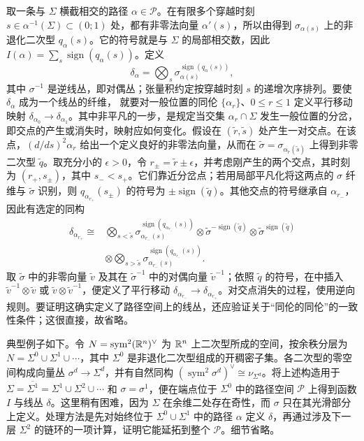 取一条与 $\Sigma$ 横截相交的路径 $\alpha\in\mathcal P$。在有限多个穿越时刻 $s\in\alpha^{-1}(\Sigma)\subset(0;1)$ 处，都有非零法向量 $\alpha'(s)$，所以由得到 $\sigma_{\alpha(s)}$ 上的非退化二次型 $q_\alpha(s)$。它的符号就是与 $\Sigma$ 的局部相交数，因此 $I(\alpha)=\sum_s\operatorname{sign}(q_\alpha(s))$。定义
\begin{equation}\label{eq:11.5}
\delta_\alpha=\bigotimes_s\sigma_{\alpha(s)}^{\operatorname{sign}(q_\alpha(s))},
\end{equation}
其中 $\sigma^{-1}$ 是逆线丛，即对偶丛；张量积约定按穿越时刻 $s$ 的递增次序排列。要使 $\delta_\alpha$ 成为一个线丛的纤维，
就要对一般位置的同伦 $\{\alpha_r\}$、$0\leq r\leq1$ 定义平行移动映射 $\delta_{\alpha_0}\to\delta_{\alpha_1}$。其中非平凡的一步，是规定当交集 $\alpha_r\cap\Sigma$ 发生一般位置的分岔，即交点的产生或消失时，映射应如何变化。假设在 $(\tilde r,\allowbreak \tilde s)$ 处产生一对交点。在该点，$(d/ds)^2\alpha_r$ 给出一个定义良好的非零法向量，从而在 $\tilde\sigma=\sigma_{\alpha_{\tilde r}(\tilde s)}$ 上得到非零二次型 $\tilde q$。取充分小的 $\epsilon>0$，令 $r_\pm=\tilde r\pm\epsilon$，并考虑刚产生的两个交点，其时刻为 $(r_+,\allowbreak s_\pm)$，其中 $s_-<s_+$。它们靠近分岔点；若用局部平凡化将这两点的 $\sigma$ 纤维与 $\tilde\sigma$ 识别，则 $q_{\alpha_{r_+}}(s_\pm)$ 的符号为 $\pm\operatorname{sign}(\tilde q)$。其他交点的符号继承自 $\alpha_{r_-}$，因此有选定的同构
\begin{equation}\label{eq:11.6}
\begin{aligned}
\delta_{\alpha_{r_+}}\cong{}&
\bigotimes_{s<\tilde s}\sigma_{\alpha_{r_-}(s)}^{\operatorname{sign}(q_{\alpha_{r_-}}(s))}
\otimes\tilde\sigma^{-\operatorname{sign}(\tilde q)}\otimes\tilde\sigma^{\operatorname{sign}(\tilde q)}\\
&\otimes\bigotimes_{s>\tilde s}\sigma_{\alpha_{r_-}(s)}^{\operatorname{sign}(q_{\alpha_{r_-}}(s))}.
\end{aligned}
\end{equation}
取 $\tilde\sigma$ 中的非零向量 $\tilde v$ 及其在 $\tilde\sigma^{-1}$ 中的对偶向量 $\tilde v^{-1}$；依照 $\tilde q$ 的符号，在中插入 $\tilde v^{-1}\otimes\tilde v$ 或 $\tilde v\otimes\tilde v^{-1}$，便定义了平行移动 $\delta_{\alpha_{r_-}}\to\delta_{\alpha_{r_+}}$。对交点消失的过程，使用逆向规则。要证明这确实定义了路径空间上的线丛，还应验证关于“同伦的同伦”的一致性条件；这很直接，故省略。

典型例子如下。令 $N=\operatorname{sym}^2(\mathbb R^n)^\vee$ 为 $\mathbb R^n$ 上二次型所成的空间，按余秩分层为 $N=\Sigma^0\cup\Sigma^1\cup\cdots$，其中 $\Sigma^0$ 是非退化二次型组成的开稠密子集。各二次型的零空间构成向量丛 $\sigma^d\to\Sigma^d$，并有自然同构 $(\operatorname{sym}^2\sigma^d)^\vee\cong\nu_{\Sigma^d}$。将上述构造用于 $\Sigma=\overline{\Sigma^1}=\Sigma^1\cup\Sigma^2\cup\cdots$ 和 $\sigma=\sigma^1$，便在端点位于 $\Sigma^0$ 中的路径空间 $\mathcal P$ 上得到函数 $I$ 与线丛 $\delta$。这里稍有困难，因为 $\Sigma$ 在余维二处存在奇性，而 $\sigma$ 只在其光滑部分上定义。处理方法是先对始终位于 $\Sigma^0\cup\Sigma^1$ 中的路径 $\alpha$ 定义 $\delta$，再通过涉及下一层 $\Sigma^2$ 的链环的一项计算，证明它能延拓到整个 $\mathcal P$。细节省略。

